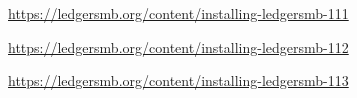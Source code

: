 

\url{https://ledgersmb.org/content/installing-ledgersmb-111}

\url{https://ledgersmb.org/content/installing-ledgersmb-112}

\url{https://ledgersmb.org/content/installing-ledgersmb-113}
